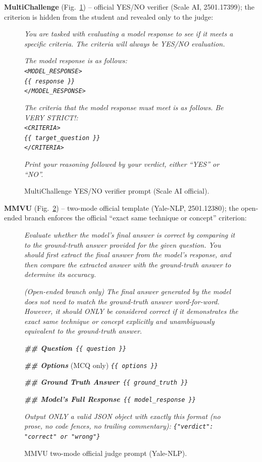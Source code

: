 \documentclass{llmxive}
\begin{document}
\textbf{MultiChallenge} (Fig.~\ref{fig:prompt-judge-multich}) -- official YES/NO verifier (Scale AI, 2501.17399); the criterion is hidden from the student and revealed only to the judge:
\begin{figure}[!htbp]
\begin{prompttemplatefig}
\small
\emph{You are tasked with evaluating a model response to see if it meets a specific criteria. The criteria will always be YES/NO evaluation.}

\emph{The model response is as follows:\\
\texttt{<MODEL\_RESPONSE>}\\
\texttt{\{\{ response \}\}}\\
\texttt{</MODEL\_RESPONSE>}}

\emph{The criteria that the model response must meet is as follows. Be VERY STRICT!:\\
\texttt{<CRITERIA>}\\
\texttt{\{\{ target\_question \}\}}\\
\texttt{</CRITERIA>}}

\emph{Print your reasoning followed by your verdict, either ``YES'' or ``NO''.}
\end{prompttemplatefig}
\caption{MultiChallenge YES/NO verifier prompt (Scale AI official).}
\label{fig:prompt-judge-multich}
\end{figure}

\textbf{MMVU} (Fig.~\ref{fig:prompt-judge-mmvu}) -- two-mode official template (Yale-NLP, 2501.12380); the open-ended branch enforces the official ``exact same technique or concept'' criterion:
\begin{figure}[!htbp]
\begin{prompttemplatefig}
\small
\emph{Evaluate whether the model's final answer is correct by comparing it to the ground-truth answer provided for the given question. You should first extract the final answer from the model's response, and then compare the extracted answer with the ground-truth answer to determine its accuracy.}

\emph{(Open-ended branch only) The final answer generated by the model does not need to match the ground-truth answer word-for-word. However, it should ONLY be considered correct if it demonstrates the exact same technique or concept explicitly and unambiguously equivalent to the ground-truth answer.}

\textbf{\emph{\#\# Question}}\ \emph{\texttt{\{\{ question \}\}}}

\textbf{\emph{\#\# Options}} (MCQ only) \emph{\texttt{\{\{ options \}\}}}

\textbf{\emph{\#\# Ground Truth Answer}}\ \emph{\texttt{\{\{ ground\_truth \}\}}}

\textbf{\emph{\#\# Model's Full Response}}\ \emph{\texttt{\{\{ model\_response \}\}}}

\emph{Output ONLY a valid JSON object with exactly this format (no prose, no code fences, no trailing commentary): \texttt{\{"verdict": "correct" or "wrong"\}}}
\end{prompttemplatefig}
\caption{MMVU two-mode official judge prompt (Yale-NLP).}
\label{fig:prompt-judge-mmvu}
\end{figure}
\end{document}
